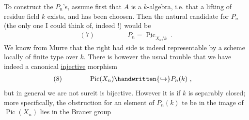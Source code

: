 To construct the $P_n$'s, assume first that $A$ is a $k$-algebra, i.e. that a lifting of  residue field $k$ exists, and has been choosen. Then the natural candidate for $P_n$ (the only one I could think of, indeed !) would be
\[
\begin{aligned}
(7)\qquad\qquad & P_n=\underline{\operatorname{Pic}}_{X_n/k}\ .
\end{aligned}
\]
We know from Murre that the right had side is indeed representable by a scheme locally of finite type over $k$. There is however the usual trouble that we have indeed a canonical \uline{injective} morphism
\[
\begin{aligned}
(8)\qquad\qquad & \operatorname{Pic}(X_n)\handwritten{\hookrightarrow}P_n(k)\ ,
\end{aligned}
\]
but in general we are not sureit is bijective. However it is if $k$ is separably closed; more specifically, the obstruction for an element of $P_n(k)$ te be in the image of $\operatorname{Pic}(X_n)$ lies in the Brauer group  \par\noindent{}
